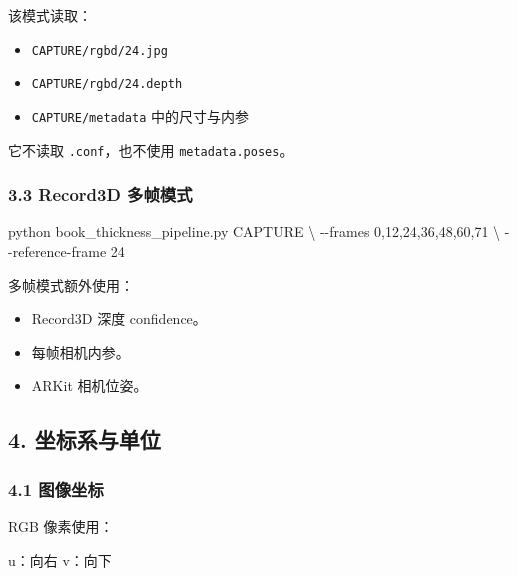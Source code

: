 \documentclass[
  chinese,
  11pt,
  a4paper,
]{article}
\newenvironment{Shaded}{\begin{snugshade}}{\end{snugshade}}
\newcommand{\AttributeTok}[1]{\textcolor[rgb]{0.13,0.29,0.53}{#1}}
\newcommand{\DataTypeTok}[1]{\textcolor[rgb]{0.13,0.29,0.53}{#1}}
\newcommand{\ExtensionTok}[1]{#1}
\newcommand{\NormalTok}[1]{#1}
\providecommand{\tightlist}{%
  \setlength{\itemsep}{0pt}\setlength{\parskip}{0pt}}
\begin{document}
该模式读取：

\begin{itemize}
\tightlist
\item
  \texttt{CAPTURE/rgbd/24.jpg}
\item
  \texttt{CAPTURE/rgbd/24.depth}
\item
  \texttt{CAPTURE/metadata} 中的尺寸与内参
\end{itemize}

它不读取 \texttt{.conf}，也不使用 \texttt{metadata.poses}。

\subsubsection{3.3 Record3D
多帧模式}\label{33-record3d-ux591aux5e27ux6a21ux5f0f}

\begin{Shaded}
\begin{Highlighting}[]
\ExtensionTok{python}\NormalTok{ book\_thickness\_pipeline.py CAPTURE }\DataTypeTok{\textbackslash{}}
  \AttributeTok{{-}{-}frames}\NormalTok{ 0,12,24,36,48,60,71 }\DataTypeTok{\textbackslash{}}
  \AttributeTok{{-}{-}reference{-}frame}\NormalTok{ 24}
\end{Highlighting}
\end{Shaded}

多帧模式额外使用：

\begin{itemize}
\tightlist
\item
  Record3D 深度 confidence。
\item
  每帧相机内参。
\item
  ARKit 相机位姿。
\end{itemize}

\subsection{4.
坐标系与单位}\label{4-ux5750ux6807ux7cfbux4e0eux5355ux4f4d}

\subsubsection{4.1 图像坐标}\label{41-ux56feux50cfux5750ux6807}

RGB 像素使用：

\begin{Shaded}
\begin{Highlighting}[]
\NormalTok{u：向右}
\NormalTok{v：向下}
\end{Highlighting}
\end{Shaded}
\end{document}
